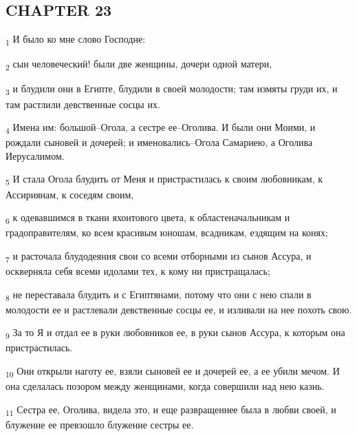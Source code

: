 \subsection{CHAPTER 23}
\begin{tcolorbox}
\textsubscript{1} И было ко мне слово Господне:
\end{tcolorbox}
\begin{tcolorbox}
\textsubscript{2} сын человеческий! были две женщины, дочери одной матери,
\end{tcolorbox}
\begin{tcolorbox}
\textsubscript{3} и блудили они в Египте, блудили в своей молодости; там измяты груди их, и там растлили девственные сосцы их.
\end{tcolorbox}
\begin{tcolorbox}
\textsubscript{4} Имена им: большой--Огола, а сестре ее--Оголива. И были они Моими, и рождали сыновей и дочерей; и именовались--Огола Самариею, а Оголива Иерусалимом.
\end{tcolorbox}
\begin{tcolorbox}
\textsubscript{5} И стала Огола блудить от Меня и пристрастилась к своим любовникам, к Ассириянам, к соседям своим,
\end{tcolorbox}
\begin{tcolorbox}
\textsubscript{6} к одевавшимся в ткани яхонтового цвета, к областеначальникам и градоправителям, ко всем красивым юношам, всадникам, ездящим на конях;
\end{tcolorbox}
\begin{tcolorbox}
\textsubscript{7} и расточала блудодеяния свои со всеми отборными из сынов Ассура, и оскверняла себя всеми идолами тех, к кому ни пристращалась;
\end{tcolorbox}
\begin{tcolorbox}
\textsubscript{8} не переставала блудить и с Египтянами, потому что они с нею спали в молодости ее и растлевали девственные сосцы ее, и изливали на нее похоть свою.
\end{tcolorbox}
\begin{tcolorbox}
\textsubscript{9} За то Я и отдал ее в руки любовников ее, в руки сынов Ассура, к которым она пристрастилась.
\end{tcolorbox}
\begin{tcolorbox}
\textsubscript{10} Они открыли наготу ее, взяли сыновей ее и дочерей ее, а ее убили мечом. И она сделалась позором между женщинами, когда совершили над нею казнь.
\end{tcolorbox}
\begin{tcolorbox}
\textsubscript{11} Сестра ее, Оголива, видела это, и еще развращеннее была в любви своей, и блужение ее превзошло блужение сестры ее.
\end{tcolorbox}
